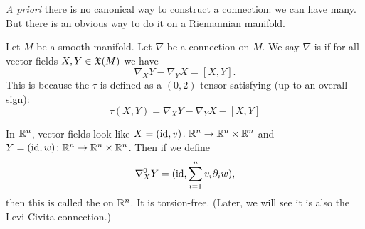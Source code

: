 \begin{remark}
\textit{A priori} there is no canonical way to construct a connection:
we can have many. But there is an obvious way to do it on a Riemannian manifold.
\end{remark}

\begin{definition}
Let $M$ be a smooth manifold.
Let $\nabla$ be a connection on $M$.
We say $\nabla$ is  if for all vector fields
$X,Y\in\mathfrak{X}(M)$ we have
\begin{equation}
\nabla_{X}Y-\nabla_{Y}X=[X,Y].
\end{equation}
This is because the  $\tau$ is defined as a
$(0,2)$-tensor satisfying (up to an overall sign):
\begin{equation}
\tau(X,Y) = \nabla_{X}Y-\nabla_{Y}X - [X,Y]
\end{equation}
\end{definition}

\begin{example}
In $\mathbb{R}^{n}$, vector fields look like $X=(\operatorname{id},v)\colon\mathbb{R}^{n}\to\mathbb{R}^{n}\times\mathbb{R}^{n}$
and $Y=(\operatorname{id},w)\colon\mathbb{R}^{n}\to\mathbb{R}^{n}\times\mathbb{R}^{n}$. Then if we define
\begin{equation}
\nabla_{X}^{0}Y=(\operatorname{id},\sum^{n}_{i=1}v_{i}\partial_{i}w),
\end{equation}
then this is called the  on $\mathbb{R}^{n}$. It
is torsion-free. (Later, we will see it is also the Levi-Civita connection.)
\end{example}
